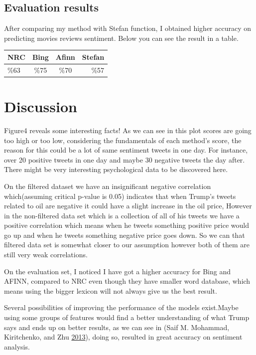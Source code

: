 \documentclass[]{article}
\begin{document}
\newpage 

\subsection{Evaluation results}\label{evaluation-results}

After comparing my method with Stefan function, I obtained higher
accuracy on predicting movies reviews sentiment. Below you can see the
result in a table.

\begin{longtable}[]{@{}lccr@{}}
\toprule
NRC & Bing & Afinn & Stefan\tabularnewline
\midrule
\endhead
\%63 & \%75 & \%70 & \%57\tabularnewline
\bottomrule
\end{longtable}

\section{Discussion}\label{discussion}

Figure4 reveals some interesting facts! As we can see in this plot
scores are going too high or too low, considering the fundamentals of
each method's score, the reason for this could be a lot of same
sentiment tweets in one day. For instance, over 20 positive tweets in
one day and maybe 30 negative tweets the day after. There might be very
interesting psychological data to be discovered here.

On the filtered dataset we have an insignificant negative correlation
which(assuming critical p-value is 0.05) indicates that when Trump's
tweets related to oil are negative it could have a slight increase in
the oil price, However in the non-filtered data set which is a
collection of all of his tweets we have a positive correlation which
means when he tweets something positive price would go up and when he
tweets something negative price goes down. So we can that filtered data
set is somewhat closer to our assumption however both of them are still
very weak correlations.

On the evaluation set, I noticed I have got a higher accuracy for Bing
and AFINN, compared to NRC even though they have smaller word database,
which means using the bigger lexicon will not always give us the best
result.

Several possibilities of improving the performance of the models
exist.Maybe using some groups of features would find a better
understanding of what Trump says and ends up on better results, as we
can see in (Saif M. Mohammad, Kiritchenko, and Zhu
\protect\hyperlink{ref-mohammad_nrc-canada_2013}{2013}), doing so,
resulted in great accuracy on sentiment analysis.
\end{document}
